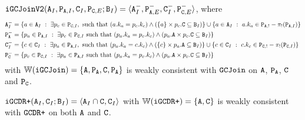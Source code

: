 \begin{example}
$\tt{iGCJoinV2}(\tt{A}_I, \tt{P}_{\tt{A},I}, \tt{C}_I, \tt{P}_{\tt{C},E}; \tt{B}_I) = \langle \tt{A}_I^-, \tt{P}_{\tt{A},E}^-, \tt{C}_I^-, \tt{P}_{\tt{C},E}^-\rangle$, where
\begin{align*}
\tt{A}_I^- &= \{a \in \tt{A}_I ~:~ \exists p_c \in \tt{P}_{\tt{C},I}, \text{ such that } (a.k_a = p_c.k_c) \wedge \left(\{a\} \times p_c.\tt{C} \subseteq \tt{B}_I\right)\} \cup \{a \in \tt{A}_I ~:~ a.k_a \in \tt{P}_{\tt{A},!} - \pi_!(\tt{P}_{\tt{A},I})\}\\
\tt{P}_\tt{A}^- &= \{p_a \in \tt{P}_{\tt{A},I} ~:~ \exists p_c \in \tt{P}_{\tt{C},I} \text{ such that } (p_a.k_a = p_c.k_c) \wedge \left(p_a.\tt{A} \times p_c.\tt{C} \subseteq \tt{B}_I\right)\}\\
\tt{C}_I^- &= \{c \in \tt{C}_I ~:~ \exists p_a \in \tt{P}_{\tt{A},I}, \text{ such that } (p_a.k_a = c.k_c) \wedge \left(\{c\} \times p_a.\tt{A} \subseteq \tt{B}_I\right)\} \cup \{c \in \tt{C}_I ~:~ c.k_c \in \tt{P}_{\tt{C},!} - \pi_!(\tt{P}_{\tt{C},I})\}\\
\tt{P}_\tt{C}^- &= \{p_c \in \tt{P}_{\tt{C},I} ~:~ \exists p_a \in \tt{P}_{\tt{A},I} \text{ such that } (p_a.k_a = p_c.k_c) \wedge \left(p_a.\tt{A} \times p_c.\tt{C} \subseteq \tt{B}_I\right)\}
\end{align*}
with $\mathbb{W}(\tt{iGCJoin}) = \{\tt{A}, \tt{P}_\tt{A}, \tt{C}, \tt{P}_\tt{A}\}$ is weakly consistent with $\tt{GCJoin}$ on $\tt{A}$, $\tt{P}_\tt{A}$, $\tt{C}$ and $\tt{P}_\tt{C}$.
\end{example}


\begin{example}
$\tt{iGCDR+}(\tt{A}_I, \tt{C}_I; \tt{B}_I) = \langle \tt{A}_I \cap \tt{C}, \tt{C}_I\rangle$ with $\mathbb{W}(\tt{iGCDR+}) = \{\tt{A}, \tt{C}\}$ is weakly consistent with $\tt{GCDR+}$ on both $\tt{A}$ and $\tt{C}$.
\end{example}

